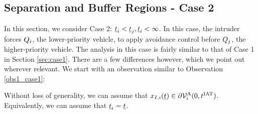 \subsection{Separation and Buffer Regions - Case 2} \label{sec:case2}
In this section, we consider Case 2: $\underline{t}_i < \underline{t}_j, \underline{t}_i <\infty$. In this case, the intruder forces $Q_i$, the lower-priority vehicle, to apply avoidance control before $Q_j$, the higher-priority vehicle. The analysis in this case is fairly similar to that of Case 1 in Section \ref{sec:case1}. There are a few differences however, which we point out wherever relevant. We start with an observation similar to Observation \ref{obs1_case1}:
\begin{observation} \label{obs1_case2}
Without loss of generality, we can assume that $x_{I, i}(\underline{t}) \in \partial \mathcal{V}^{\text{A}}_{i}(0, t^\text{IAT})$. Equivalently, we can assume that $\underline{t}_i = \underline{t}$.
\end{observation}